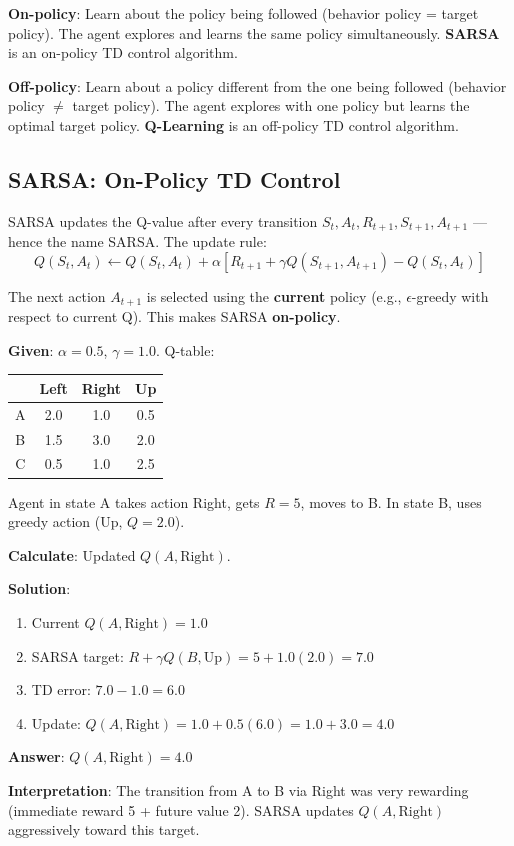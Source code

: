 \documentclass[11pt,a4paper]{article}
\begin{document}
\textbf{On-policy}: Learn about the policy being followed (behavior policy = target policy). The agent explores and learns the same policy simultaneously. \textbf{SARSA} is an on-policy TD control algorithm.

\textbf{Off-policy}: Learn about a policy different from the one being followed (behavior policy $\neq$ target policy). The agent explores with one policy but learns the optimal target policy. \textbf{Q-Learning} is an off-policy TD control algorithm.

\subsection{SARSA: On-Policy TD Control}

SARSA updates the Q-value after every transition $S_t, A_t, R_{t+1}, S_{t+1}, A_{t+1}$ --- hence the name SARSA. The update rule:
\[
Q(S_t, A_t) \leftarrow Q(S_t, A_t) + \alpha [R_{t+1} + \gamma Q(S_{t+1}, A_{t+1}) - Q(S_t, A_t)]
\]

The next action $A_{t+1}$ is selected using the \textbf{current} policy (e.g., $\epsilon$-greedy with respect to current Q). This makes SARSA \textbf{on-policy}.

\begin{tcolorbox}[colback=blue!5!white,colframe=blue!75!black,title=\textbf{Worked Example 34: SARSA Update}]
\textbf{Given}: $\alpha = 0.5$, $\gamma = 1.0$. Q-table:
\begin{center}
\begin{tabular}{|c|c|c|c|}
\hline
& Left & Right & Up \\ \hline
A & 2.0 & 1.0 & 0.5 \\ \hline
B & 1.5 & 3.0 & 2.0 \\ \hline
C & 0.5 & 1.0 & 2.5 \\ \hline
\end{tabular}
\end{center}

Agent in state A takes action Right, gets $R = 5$, moves to B. In state B, uses greedy action (Up, $Q = 2.0$).

\textbf{Calculate}: Updated $Q(A, \text{Right})$.

\textbf{Solution}:
\begin{enumerate}
    \item Current $Q(A, \text{Right}) = 1.0$
    \item SARSA target: $R + \gamma Q(B, \text{Up}) = 5 + 1.0(2.0) = 7.0$
    \item TD error: $7.0 - 1.0 = 6.0$
    \item Update: $Q(A, \text{Right}) = 1.0 + 0.5(6.0) = 1.0 + 3.0 = 4.0$
\end{enumerate}

\textbf{Answer}: $Q(A, \text{Right}) = 4.0$

\textbf{Interpretation}: The transition from A to B via Right was very rewarding (immediate reward 5 + future value 2). SARSA updates $Q(A, \text{Right})$ aggressively toward this target.
\end{tcolorbox}
\end{document}
